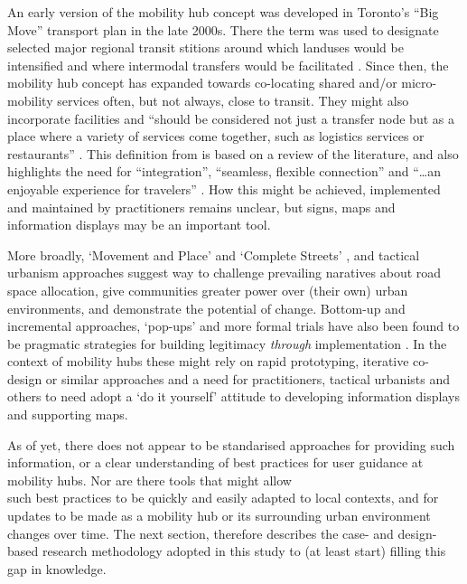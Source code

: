 \documentclass[preprint, 3p,
authoryear]{elsarticle} %
\begin{document}
An early version of the mobility hub concept was developed in Toronto's
``Big Move'' transport plan \citep{Metrolinx:2008aa} in the late 2000s.
There the term was used to designate selected major regional transit
stitions around which landuses would be intensified and where intermodal
transfers would be facilitated
\citep[\citet{Engel-Yan:2012aa}]{Salsberg:2010aa}. Since then, the
mobility hub concept has expanded towards co-locating shared and/or
micro-mobility services often, but not always, close to transit. They
might also incorporate facilities and ``should be considered not just a
transfer node but as a place where a variety of services come together,
such as logistics services or restaurants'' \citep{Roukouni:2023aa}.
This definition from \citet{Roukouni:2023aa} is based on a review of the
literature, and also highlights the need for ``integration'',
``seamless, flexible connection'' and ``\ldots an enjoyable experience
for travelers'' . How this might be achieved, implemented and maintained
by practitioners remains unclear, but signs, maps and information
displays may be an important tool.

More broadly, `Movement and Place' and `Complete Streets'
\citep{Delbosc:2018aa}, and tactical urbanism approaches
\citep{Lydon:2015aa} suggest way to challenge prevailing naratives about
road space allocation, give communities greater power over (their own)
urban environments, and demonstrate the potential of change. Bottom-up
and incremental approaches, `pop-ups' and more formal trials have also
been found to be pragmatic strategies for building legitimacy
\emph{through} implementation \citep{Reynolds:2021ab}. In the context of
mobility hubs these might rely on rapid prototyping, iterative co-design
or similar approaches and a need for practitioners, tactical urbanists
and others to need adopt a `do it yourself' attitude to developing
information displays and supporting maps.

As of yet, there does not appear to be standarised approaches for
providing such information, or a clear understanding of best practices
for user guidance at mobility hubs. Nor are there tools that might
allow\\
such best practices to be quickly and easily adapted to local contexts,
and for updates to be made as a mobility hub or its surrounding urban
environment changes over time. The next section, therefore describes the
case- and design-based research methodology adopted in this study to (at
least start) filling this gap in knowledge.
\end{document}
